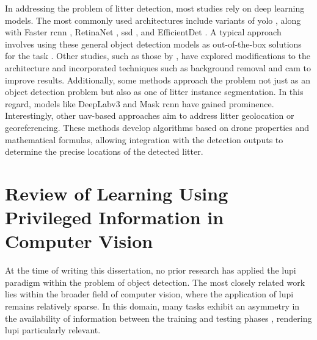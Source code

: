 
In addressing the problem of litter detection, most studies rely on deep learning models. The most commonly used architectures include variants of \gls{yolo} \cite{yolo, yolov5, yolov8}, along with Faster \gls{rcnn} \cite{fasterrcnn}, RetinaNet \cite{retinanet}, \gls{ssd} \cite{ssd}, and EfficientDet \cite{efficientdet}. A typical approach involves using these general object detection models as out-of-the-box solutions for the task \cite{soda_dataset, detect_litter, plastopol, beach_litter}. Other studies, such as those by \cite{small_litter_detection, styrofoam}, have explored modifications to the architecture and incorporated techniques such as background removal and \gls{cam} to improve results.
Additionally, some methods \cite{taco2020, mju_waste, zerowaste} approach the problem not just as an object detection problem but also as one of litter instance segmentation. In this regard, models like DeepLabv3 \cite{deeplabv3} and Mask \gls{rcnn} \cite{maskrcnn} have gained prominence. Interestingly, other \gls{uav}-based approaches \cite{beach_litter,haida,uavvaste} aim to address litter geolocation or georeferencing. These methods develop algorithms based on drone properties and mathematical formulas, allowing integration with the detection outputs to determine the precise locations of the detected litter.


\section{Review of Learning Using Privileged Information in Computer Vision}
\label{subsec:2_lupi}
At the time of writing this dissertation, no prior research has applied the \gls{lupi} paradigm within the problem of object detection. The most closely related work lies within the broader field of computer vision, where the application of \gls{lupi} remains relatively sparse. In this domain, many tasks exhibit an asymmetry in the availability of information between the training and testing phases \cite{learning2rank}, rendering \gls{lupi} particularly relevant.

